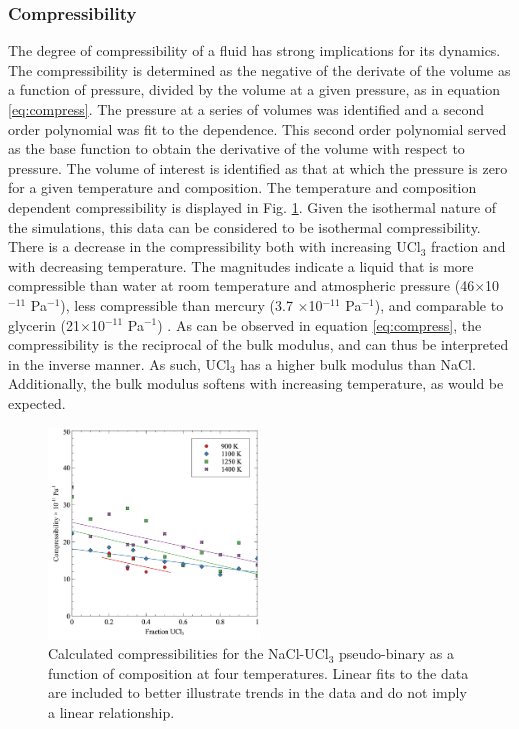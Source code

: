 \documentclass[preprint,3p,10pt,onecolumn,number,sort&compress]{elsarticle}
\begin{document}
\subsubsection{Compressibility}

The degree of compressibility of a fluid has strong implications for its dynamics. The compressibility is determined as the negative of the derivate of the volume as a function of pressure, divided by the volume at a given pressure, as in equation \ref{eq:compress}. The pressure at a series of volumes was identified and a second order polynomial was fit to the dependence. This second order polynomial served as the base function to obtain the derivative of the volume with respect to pressure. The volume of interest is identified as that at which the pressure is zero for a given temperature and composition. The temperature and composition dependent compressibility is displayed in Fig. \ref{fig:compress}. Given the isothermal nature of the simulations, this data can be considered to be isothermal compressibility. There is a decrease in the compressibility both with increasing UCl$_3$ fraction and with decreasing temperature. The magnitudes indicate a liquid that is more compressible than water at room temperature and atmospheric pressure (46$\times$10$^{-11}$ Pa$^{-1}$), less compressible than mercury (3.7 $\times$10$^{-11}$ Pa$^{-1}$), and comparable to glycerin (21$\times$10$^{-11}$ Pa$^{-1}$) \cite{aiphandbook}. As can be observed in equation \ref{eq:compress}, the compressibility is the reciprocal of the bulk modulus, and can thus be interpreted in the inverse manner. As such, UCl$_3$ has a higher bulk modulus than NaCl. Additionally, the bulk modulus softens with increasing temperature, as would be expected.  

\begin{figure}[htb]
\centering
\includegraphics[width=0.5\textwidth]{figbulk.jpg}
\caption{Calculated compressibilities for the NaCl-UCl{$_3$} pseudo-binary as a function of composition at four temperatures. Linear fits to the data are included to better illustrate trends in the data and do not imply a linear relationship.} 
\label{fig:compress}
\end{figure}
\end{document}
